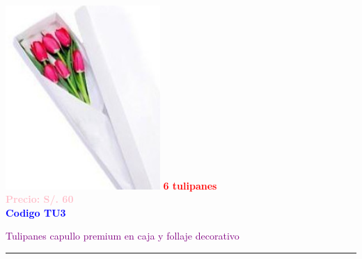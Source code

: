 \begin{multicols}{2}
    \begin{minipage}{\linewidth}
        \centering
        \includegraphics[height=7cm]{imagenes_extraidas/image_2_5} %
        \newline
        \vspace{0.1cm}
        \textbf{\Large \textcolor{red}{6 tulipanes}} \\ %
        \vspace{0.2cm}
        \textbf{\textcolor{pink}{Precio: S/. 60}} \\ %
        \vspace{0.2cm}
        \textbf{\textcolor{blue}{Codigo TU3}} \\ %
        \vspace{0.2cm}
        \begin{minipage}{0.8\linewidth} 
            \small \textcolor{purple}{Tulipanes capullo premium en caja y follaje decorativo} %
        \end{minipage}
        \vspace{0.1cm}        
        \rule{\linewidth}{0.5pt}
    \end{minipage}
    \end{multicols}
\newpage


